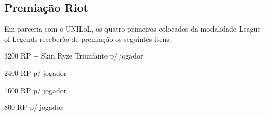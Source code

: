 \subsection{Premiação Riot}

Em parceria com o UNILoL, os quatro primeiros colocados da modalidade League of Legends receberão de premiação os seguintes itens:

\begin{description}[leftmargin=!,labelwidth=\widthof{\bfseries 1º colocado},labelindent=1.5em]
	\item[1º colocado] 3200 RP + Skin Ryze Triunfante p/ jogador
	\item[2º colocado] 2400 RP p/ jogador
	\item[3º colocado] 1600 RP p/ jogador
	\item[4º colocado] 800 RP p/ jogador
\end{description}
